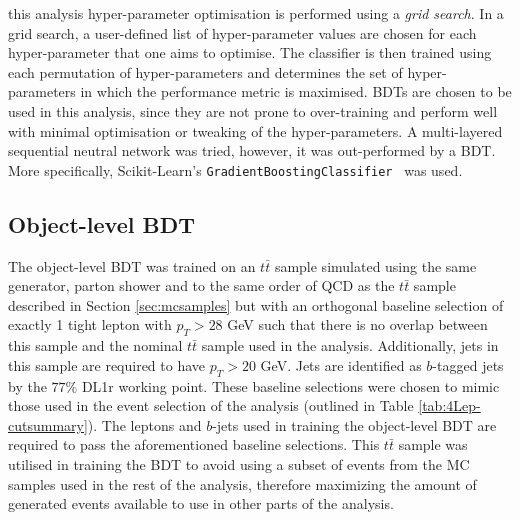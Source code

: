this analysis hyper-parameter optimisation is performed using a \textit{grid search}. In a grid search, a user-defined list of hyper-parameter values are chosen for each hyper-parameter that one aims to optimise. The classifier is then trained using each permutation of hyper-parameters and determines the set of hyper-parameters in which the performance metric is maximised. BDTs are chosen to be used in this analysis, since they are not prone to over-training and perform well with minimal optimisation or tweaking of the hyper-parameters. A multi-layered sequential neutral network was tried, however, it was out-performed by a BDT. More specifically, Scikit-Learn's \texttt{GradientBoostingClassifier}~\cite{scikit-bdt} was used.

\subsection{Object-level BDT}
\label{sec:object-level-bdt}
The object-level BDT was trained on an $t\bar{t}$ sample simulated using the same generator, parton shower and to the same order of QCD as the $t\bar{t}$ sample described in Section \ref{sec:mcsamples} but with an orthogonal baseline selection of exactly 1 tight lepton with $p_{T} > 28$ GeV such that there is no overlap between this sample and the nominal $t\bar{t}$ sample used in the analysis. Additionally, jets in this sample are required to have $p_{T} > 20$ GeV. Jets are identified as $b$-tagged jets by the $77\%$ DL1r working point. These baseline selections were chosen to mimic those used in the event selection of the analysis (outlined in Table \ref{tab:4Lep-cutsummary}). The leptons and $b$-jets used in training the object-level BDT are required to pass the aforementioned baseline selections. This $t\bar{t}$ sample was utilised in training the BDT to avoid using a subset of events from the MC samples used in the rest of the analysis, therefore maximizing the amount of generated events available to use in other parts of the analysis.\\

